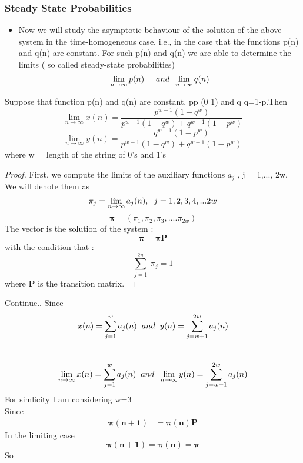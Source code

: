 \documentclass{beamer}
\begin{document}
\begin{frame}
\frametitle{Steady State Probabilities}
\begin{itemize}
\item Now we will study the asymptotic behaviour of the solution of the above system in the time-homogeneous case, i.e., in the case that the functions p(n) and q(n) are constant. For such p(n) and q(n) we are able to determine the limits ( so called steady-state probabilities) \\
\[\lim_{n\to\infty}p(n) \hspace{0.5cm}and \hspace{0.2cm} \lim_{n\to\infty}q(n) \]
\end{itemize}
  \begin{theorem}
    Suppose that function p(n) and q(n) are constant, p\equiv p \in (0 1) and q \equiv q=1-p.Then \\
    \[\lim_{n\to\infty}x(n)=\frac{p^{w-1}(1-q^w)}{p^{w-1}(1-q^w)+q^{w-1}(1-p^w)}\]
    \[\lim_{n\to\infty}y(n)=\frac{q^{w-1}(1-p^w)}{p^{w-1}(1-q^w)+q^{w-1}(1-p^w)}\]
    where w = length of the string of 0's and 1's
    
  \end{theorem}
    
\end{frame}    
\begin{frame}
  \begin{proof}
  First, we compute the limits of the auxiliary functions \(a_j\) , j = 1,..., 2w.
  We will denote them as
  \[\pi_j=\lim_{n\to\infty}a_j(n), \hspace{0.2cm}j=1,2,3,4,...2w\]
  \[\boldsymbol{\pi}=(\pi_1,\pi_2,\pi_3,....\pi_{2w})\]
  The vector \boldsymbol{\pi} is the solution of the system :
  \[\boldsymbol{\pi}=\boldsymbol{\pi P}\]
  with the condition that :
  \[\sum_{j=1}^{2w}\ \pi_j=1\]
  where \textbf{P} is the transition matrix.
  \end{proof}    
\end{frame}
\begin{frame}
  \begin{block}{Continue..}
    Since 
    \[x(n)=\sum_{j=1}^{w}a_j(n) \hspace{0.2cm} and \hspace{0.2cm} y(n)=\sum_{j=w+1}^{2w}a_j(n)\]
    \hspace{2cm}\Rightarrow \\ 
    \[\lim_{n\to\infty}x(n)=\sum_{j=1}^{w}a_j(n) \hspace{0.2cm} and \hspace{0.2cm} \lim_{n\to\infty}y(n)=\sum_{j=w+1}^{2w}a_j(n)\]
    For simlicity I am considering w=3 \\
    Since 
    \begin{align}
        \boldsymbol{\pi(n+1)} &= \boldsymbol{\pi(n) P} \nonumber
    \end{align}
    In the limiting case \[\boldsymbol{\pi(n+1)}=\boldsymbol{\pi(n)}=\boldsymbol{\pi}\]
    So
  \end{block}
    
\end{frame}
\end{document}
